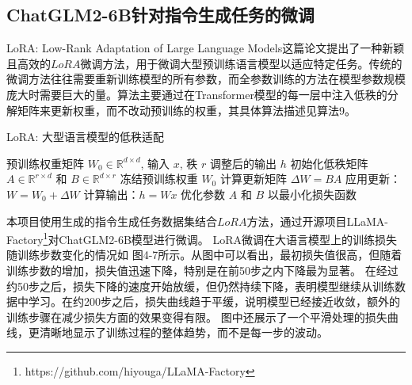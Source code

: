 \documentclass[a4paper,AutoFakeBold,oneside,12pt]{book}
\begin{document}
\subsection{ChatGLM2-6B针对指令生成任务的微调}
LoRA: Low-Rank Adaptation of Large Language Models\cite{hu2021lora}这篇论文提出了一种新颖且高效的$LoRA$微调方法，用于微调大型预训练语言模型以适应特定任务。传统的微调方法往往需要重新训练模型的所有参数，而全参数训练的方法在模型参数规模庞大时需要巨大的量。算法主要通过在Transformer模型的每一层中注入低秩的分解矩阵来更新权重，而不改动预训练的权重，其具体算法描述见算法9。
\begin{algorithm}
	\begin{spacing}{1.3}
		\caption{LoRA: 大型语言模型的低秩适配} 
		\label{LoRA_model}
		\renewcommand{\algorithmicrequire}{\textbf{输入：}}
		\renewcommand{\algorithmicensure}{\textbf{输出：}} 
			\begin{algorithmic}[1] 
				\Require 预训练权重矩阵 $W_0 \in \mathbb{R}^{d \times d}$, 输入 $x$, 秩 $r$
				\Ensure 调整后的输出 $h$
				\State 初始化低秩矩阵 $A \in \mathbb{R}^{r \times d}$ 和 $B \in \mathbb{R}^{d \times r}$
				\State 冻结预训练权重 $W_0$
				    \State 计算更新矩阵 $\Delta W = BA$
				    \State 应用更新：$W = W_0 + \Delta W$
				    \State 计算输出：$h = Wx$
				\EndFor
				\State 优化参数 $A$ 和 $B$ 以最小化损失函数
			\end{algorithmic}
	\end{spacing}
\end{algorithm}


本项目使用生成的指令生成任务数据集结合$LoRA$方法，通过开源项目LLaMA-Factory\footnote{https://github.com/hiyouga/LLaMA-Factory}对ChatGLM2-6B模型进行微调。
LoRA微调在大语言模型上的训练损失随训练步数变化的情况如 图4-7所示。从图中可以看出，最初损失值很高，但随着训练步数的增加，损失值迅速下降，特别是在前50步之内下降最为显著。
在经过约50步之后，损失下降的速度开始放缓，但仍然持续下降，表明模型继续从训练数据中学习。在约200步之后，损失曲线趋于平缓，说明模型已经接近收敛，额外的训练步骤在减少损失方面的效果变得有限。
图中还展示了一个平滑处理的损失曲线，更清晰地显示了训练过程的整体趋势，而不是每一步的波动。
\end{document}
